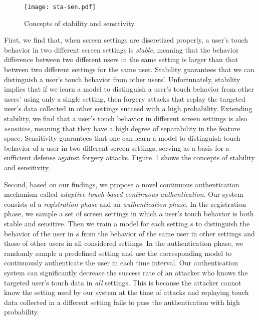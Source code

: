 \documentclass{sig-alternate-05-2015}
\begin{document}
\begin{figure}[!t]
\centering
{\texttt{[image: sta-sen.pdf]}}
\vspace{-5mm}
\caption{Concepts of stability and sensitivity.}
\label{sta-sen}
\vspace{-3mm}
\end{figure}

First, we find that, when screen settings are discretized properly,
  a user's touch behavior  in two different screen settings is \emph{stable},
 meaning that the behavior difference between two different users in the same setting 
is larger than that between two different settings for the same user. 
Stability guarantees that we can distinguish 
a user's touch behavior from other users'. Unfortunately, stability implies that if we learn a model to distinguish
 a user's touch behavior from other users' using only a single setting, 
then forgery attacks that replay the targeted user's data collected
 in other settings succeed with a high probability.  
Extending stability, we find that a user's touch behavior in different screen
 settings is also \emph{sensitive}, meaning that they have a high 
degree of separability in the feature space.
 Sensitivity guarantees that one can learn a model to distinguish
 touch behavior of a user in two different screen settings,
 serving as a basis for a sufficient defense against forgery attacks. Figure~\ref{sta-sen}
 shows the concepts of stability and sensitivity.






Second, based on our findings, we propose a novel  continuous authentication
mechanism called \emph{adaptive touch-based continuous authentication}. Our
system consists of a \emph{registration phase} and an \emph{authentication
phase}. In the registration phase, we sample a set of screen settings in which a
user's touch behavior is both stable and sensitive. Then we train a model for
each setting $s$ to distinguish the behavior of the user in $s$  from the
behavior of the same user in other settings and those of other users in all
considered settings.  In the authentication phase, we randomly sample a
predefined setting and use the corresponding model to continuously authenticate
the user in each time interval. Our authentication system can significantly
decrease the success rate of an attacker who knows the targeted user's touch
data in \emph{all} settings. This is because the attacker cannot know the
setting used by our system at the time of attacks and replaying touch data
collected in a different setting fails to pass the authentication with high
probability.  
\end{document}
